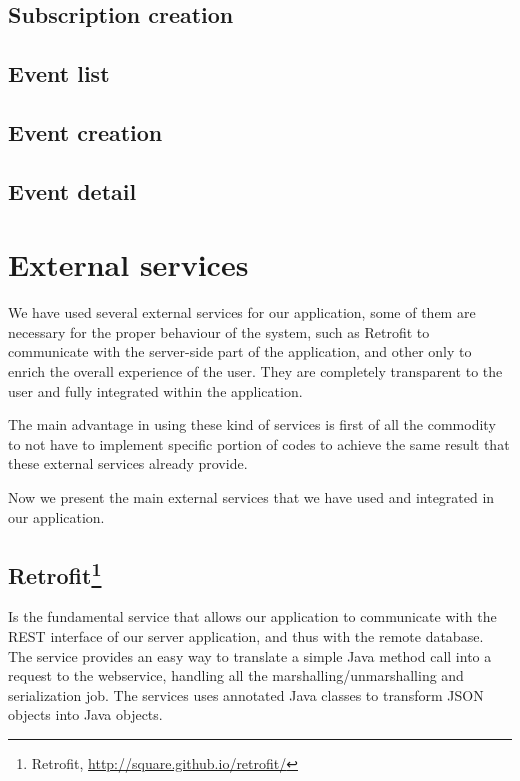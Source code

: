 \documentclass[a4paper]{scrreprt}
\begin{document}
\section{Subscription creation}

\section{Event list}

\section{Event creation}

\section{Event detail}


\chapter{External services}
We have used several external services for our application, some of them are necessary for the proper behaviour of the system, such as Retrofit to communicate with the server-side part of the application, and other only to enrich the overall experience of the user. They are completely transparent to the user and fully integrated within the application.
\par The main advantage in using these kind of services is first of all the commodity to not have to implement specific portion of codes to achieve the same result that these external services already provide.
\par Now we present the main external services that we have used and integrated in our application.

\section[Retrofit]{Retrofit\footnote{Retrofit, \url{http://square.github.io/retrofit/}}}
Is the fundamental service that allows our application to communicate with the REST interface of our server application, and thus with the remote database. The service provides an easy way to translate a simple Java method call into a request to the webservice, handling all the marshalling/unmarshalling and serialization job. The services uses annotated Java classes to transform JSON objects into Java objects.
\end{document}

